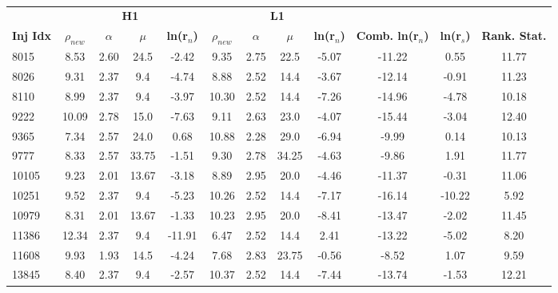 %
\begin{table}[ht]
    \centering
    \small
    \setlength{\tabcolsep}{5pt}
    \begin{adjustbox}{minipage=\linewidth-0cm, margin=-4cm 0pt 0pt 0cm}
    \begin{tabular}{lccccccccccc}
        \toprule
        & \multicolumn{4}{c}{\textbf{H1}} & \multicolumn{4}{c}{\textbf{L1}} \\
        \cmidrule(lr){2-5} \cmidrule(lr){6-9}
        \textbf{Inj Idx} & \textbf{$\rho_{new}$} & \textbf{$\alpha$} & \textbf{$\mu$} & \textbf{ln(r$_n$)} & \textbf{$\rho_{new}$} & \textbf{$\alpha$} & \textbf{$\mu$} & \textbf{ln(r$_n$)} & \textbf{Comb. ln(r$_n$)} & \textbf{ln(r$_s$)} & \textbf{Rank. Stat.} \\
        \midrule
        8015 & 8.53 & 2.60 & 24.5 & -2.42 & 9.35 & 2.75 & 22.5 & -5.07 & -11.22 & 0.55 & 11.77 \\
        8026 & 9.31 & 2.37 & 9.4 & -4.74 & 8.88 & 2.52 & 14.4 & -3.67 & -12.14 & -0.91 & 11.23 \\
        8110 & 8.99 & 2.37 & 9.4 & -3.97 & 10.30 & 2.52 & 14.4 & -7.26 & -14.96 & -4.78 & 10.18 \\
        9222 & 10.09 & 2.78 & 15.0 & -7.63 & 9.11 & 2.63 & 23.0 & -4.07 & -15.44 & -3.04 & 12.40 \\
        9365 & 7.34 & 2.57 & 24.0 & 0.68 & 10.88 & 2.28 & 29.0 & -6.94 & -9.99 & 0.14 & 10.13 \\
        9777 & 8.33 & 2.57 & 33.75 & -1.51 & 9.30 & 2.78 & 34.25 & -4.63 & -9.86 & 1.91 & 11.77 \\
        10105 & 9.23 & 2.01 & 13.67 & -3.18 & 8.89 & 2.95 & 20.0 & -4.46 & -11.37 & -0.31 & 11.06 \\
        10251 & 9.52 & 2.37 & 9.4 & -5.23 & 10.26 & 2.52 & 14.4 & -7.17 & -16.14 & -10.22 & 5.92 \\
        10979 & 8.31 & 2.01 & 13.67 & -1.33 & 10.23 & 2.95 & 20.0 & -8.41 & -13.47 & -2.02 & 11.45 \\
        11386 & 12.34 & 2.37 & 9.4 & -11.91 & 6.47 & 2.52 & 14.4 & 2.41 & -13.22 & -5.02 & 8.20 \\
        11608 & 9.93 & 1.93 & 14.5 & -4.24 & 7.68 & 2.83 & 23.75 & -0.56 & -8.52 & 1.07 & 9.59 \\
        13845 & 8.40 & 2.37 & 9.4 & -2.57 & 10.37 & 2.52 & 14.4 & -7.44 & -13.74 & -1.53 & 12.21 \\
        \bottomrule
    \end{tabular}
    \end{adjustbox}
    \caption{}
    \label{tab:pycbclive-top-right-same-trigs-fits}
\end{table}
